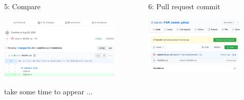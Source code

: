 \begin{frame}{ }
\begin{columns}
\begin{column}{0.48\textwidth}
\begin{exampleblock}{5: Compare}
    \begin{center}
    \includegraphics[height=3cm]{05_history/Images/FAIR_github_compareBranch1.png}
    \end{center}
\end{exampleblock}
 take some time to appear ...
\end{column}
\begin{column}{0.48\textwidth}
\begin{exampleblock}{6: Pull request commit}
    \begin{center}
    \includegraphics[height=2.8cm]{05_history/Images/FAIR_github_comparePull.png}
    \end{center}
\end{exampleblock}
\end{column}
\end{columns}
\end{frame}
